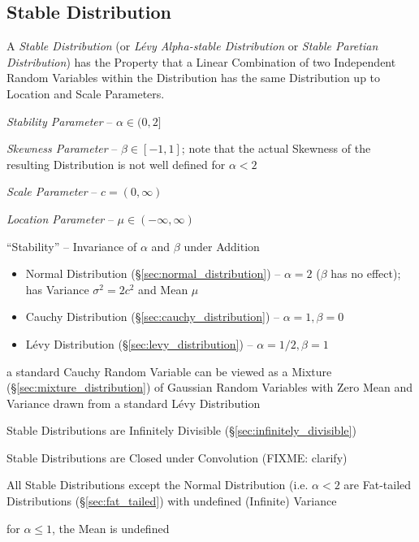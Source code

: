 \subsection{Stable Distribution}\label{sec:stable_distribution}

A \emph{Stable Distribution} (or \emph{L\'evy Alpha-stable Distribution} or
\emph{Stable Paretian Distribution}) has the Property that a Linear Combination
of two Independent Random Variables within the Distribution has the same
Distribution up to Location and Scale Parameters.

\emph{Stability Parameter} -- $\alpha \in (0, 2]$

\emph{Skewness Parameter} -- $\beta \in [-1, 1]$; note that the actual Skewness
of the resulting Distribution is not well defined for $\alpha < 2$

\emph{Scale Parameter} -- $c = (0, \infty)$

\emph{Location Parameter} -- $\mu \in (-\infty, \infty)$

``Stability'' -- Invariance of $\alpha$ and $\beta$ under Addition

\begin{itemize}
  \item Normal Distribution (\S\ref{sec:normal_distribution}) -- $\alpha = 2$
    ($\beta$ has no effect); has Variance $\sigma^2 = 2c^2$ and Mean $\mu$
  \item Cauchy Distribution (\S\ref{sec:cauchy_distribution}) --
    $\alpha = 1, \beta = 0$
  \item L\'evy Distribution (\S\ref{sec:levy_distribution}) --
    $\alpha = 1/2, \beta = 1$
\end{itemize}

a standard Cauchy Random Variable can be viewed as a Mixture
(\S\ref{sec:mixture_distribution}) of Gaussian Random Variables with Zero Mean
and Variance drawn from a standard L\'evy Distribution

Stable Distributions are Infinitely Divisible (\S\ref{sec:infinitely_divisible})

Stable Distributions are Closed under Convolution (FIXME: clarify)

All Stable Distributions except the Normal Distribution (i.e. $\alpha < 2$ are
Fat-tailed Distributions (\S\ref{sec:fat_tailed}) with undefined (Infinite)
Variance

for $\alpha \leq 1$, the Mean is undefined

